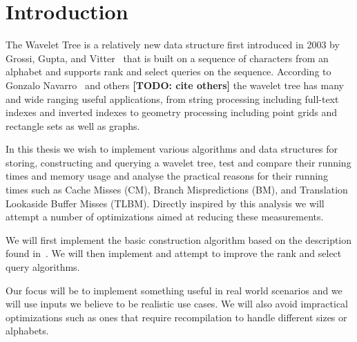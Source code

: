 \section{Introduction}
The Wavelet Tree is a relatively new data structure first introduced in 2003 by Grossi, Gupta, and Vitter~\cite{Grossi:2003:HET:644108.644250} that is built on a sequence of characters from an alphabet and supports rank and select queries on the sequence.
According to Gonzalo Navarro~\cite{Navjda13} and others \textbf{[TODO: cite others]} the wavelet tree has many and wide ranging useful applications, from string processing including full-text indexes and inverted indexes to geometry processing including point grids and rectangle sets as well as graphs.

In this thesis we wish to implement various algorithms and data structures for storing, constructing and querying a wavelet tree, test and compare their running times and memory usage and analyse the practical reasons for their running times such as Cache Misses (CM), Branch Mispredictions (BM), and Translation Lookaside Buffer Misses (TLBM). Directly inspired by this analysis we will attempt a number of optimizations aimed at reducing these measurements.

We will first implement the basic construction algorithm based on the description found in~\citep{ Navjda13}.
We will then implement and attempt to improve the rank and select query algorithms.

Our focus will be to implement something useful in real world scenarios and we will use inputs we believe to be realistic use cases.
We will also avoid impractical optimizations such as ones that require recompilation to handle different sizes or alphabets.